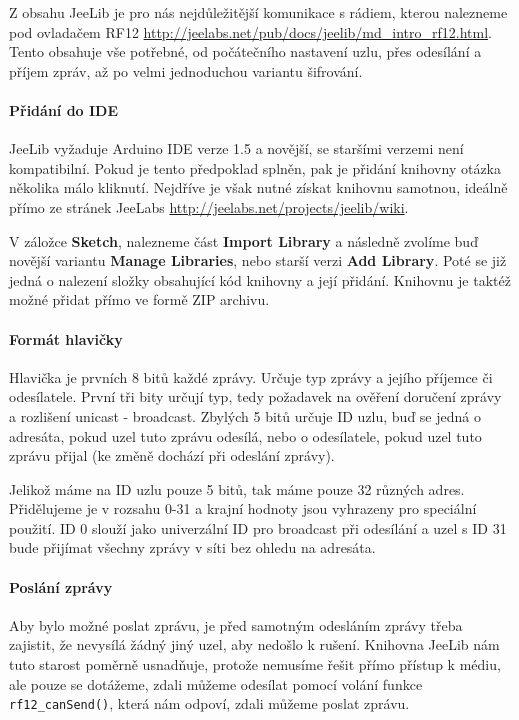 \documentclass[12pt,titlepage]{article}
\begin{document}
		Z obsahu JeeLib je pro nás nejdůležitější komunikace s rádiem, kterou nalezneme pod ovladačem RF12 \url{http://jeelabs.net/pub/docs/jeelib/md_intro_rf12.html}. Tento obsahuje vše potřebné, od počátečního nastavení uzlu, přes odesílání a příjem zpráv, až po velmi jednoduchou variantu šifrování.

		\paragraph{Přidání do IDE}
		JeeLib vyžaduje Arduino IDE verze 1.5 a novější, se staršími verzemi není kompatibilní. Pokud je tento předpoklad splněn, pak je přidání knihovny otázka několika málo kliknutí. Nejdříve je však nutné získat knihovnu samotnou, ideálně přímo ze stránek JeeLabs \url{http://jeelabs.net/projects/jeelib/wiki}.

		V záložce \textbf{Sketch}, nalezneme část \textbf{Import Library} a následně zvolíme buď novější variantu \textbf{Manage Libraries}, nebo starší verzi \textbf{Add Library}. Poté se již jedná o nalezení složky obsahující kód knihovny a její přidání. Knihovnu je taktéž možné přidat přímo ve formě ZIP archivu.

		\paragraph{Formát hlavičky}
		Hlavička je prvních 8 bitů každé zprávy. Určuje typ zprávy a jejího příjemce či odesílatele. První tři bity určují typ, tedy požadavek na ověření doručení zprávy a rozlišení unicast - broadcast. Zbylých 5 bitů určuje ID uzlu, buď se jedná o adresáta, pokud uzel tuto zprávu odesílá, nebo o odesílatele, pokud uzel tuto zprávu přijal (ke změně dochází při odeslání zprávy).

		Jelikož máme na ID uzlu pouze 5 bitů, tak máme pouze 32 různých adres. Přidělujeme je v rozsahu 0-31 a krajní hodnoty jsou vyhrazeny pro speciální použití. ID 0 slouží jako univerzální ID pro broadcast při odesílání a uzel s ID 31 bude přijímat všechny zprávy v síti bez ohledu na adresáta.

		\paragraph{Poslání zprávy}
		Aby bylo možné poslat zprávu, je před samotným odesláním zprávy třeba zajistit, že nevysílá žádný jiný uzel, aby nedošlo k rušení. Knihovna JeeLib nám tuto starost poměrně usnadňuje, protože nemusíme řešit přímo přístup k médiu, ale pouze se dotážeme, zdali můžeme odesílat pomocí volání funkce \texttt{rf12\_canSend()}, která nám odpoví, zdali můžeme poslat zprávu.
\end{document}
